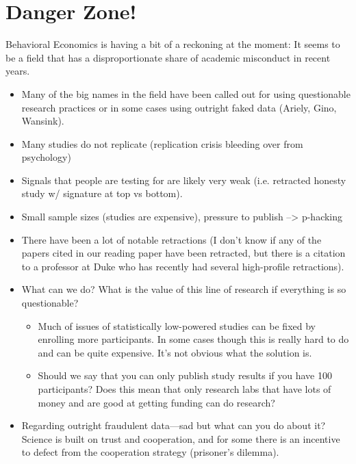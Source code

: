 \documentclass[11pt]{article}
\begin{document}
\section{Danger Zone!}

Behavioral Economics is having a bit of a reckoning at the moment: It seems to be a field that has a disproportionate share of academic misconduct in recent years. 
\begin{itemize}
    \item Many of the big names in the field have been called out for using questionable research practices or in some cases using outright faked data (Ariely, Gino, Wansink).
    \item Many studies do not replicate (replication crisis bleeding over from psychology)
    \item Signals that people are testing for are likely very weak (i.e. retracted honesty study w/ signature at top vs bottom).
    \item Small sample sizes (studies are expensive), pressure to publish --> p-hacking 
    \item There have been a lot of notable retractions (I don't know if any of the papers cited in our reading paper have been retracted, but there is a citation to a professor at Duke who has recently had several high-profile retractions).
    \item What can we do? What is the value of this line of research if everything is so questionable?
    \begin{itemize}
        \item Much of issues of statistically low-powered studies can be fixed by enrolling more participants. In some cases though this is really hard to do and can be quite expensive. It's not obvious what the solution is. 
        \item Should we say that you can only publish study results if you have 100 participants? Does this mean that only research labs that have lots of money and are good at getting funding can do research?
    \end{itemize}
    \item Regarding outright fraudulent data---sad but what can you do about it? Science is built on trust and cooperation, and for some there is an incentive to defect from the cooperation strategy (prisoner's dilemma).
\end{itemize} 
\end{document}
